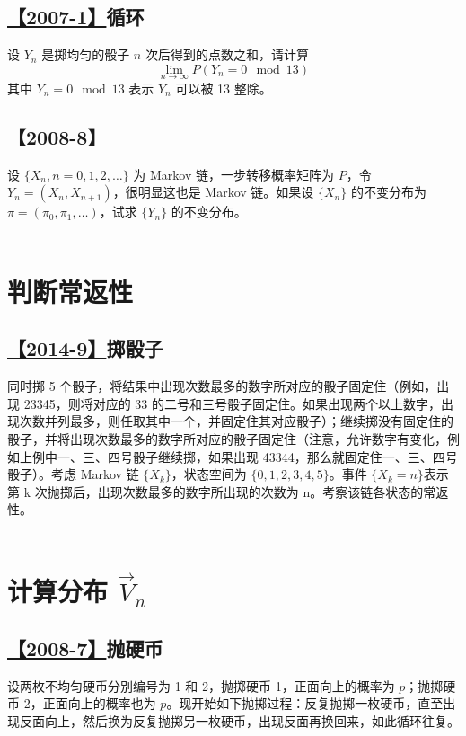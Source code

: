 \subsection{\hyperref[A2007-1]{【2007-1】}循环}\label{Q2007-1}

设 $Y_n$ 是掷均匀的骰子 $n$ 次后得到的点数之和，请计算
$$
\lim_{n\rightarrow\infty} P(Y_n=0 \mod 13)
$$
其中 $Y_n=0 \mod 13$ 表示 $Y_n$ 可以被 13 整除。

\subsection{【2008-8】}

设 $\{X_n, n=0, 1, 2, \dots\}$ 为 Markov 链，一步转移概率矩阵为 $P$，令 $Y_n=(X_n, X_{n+1})$，很明显这也是 Markov 链。如果设 $\{X_n\}$ 的不变分布为 $\pi=(\pi_0, \pi_1, \dots)$，试求 $\{Y_n\}$ 的不变分布。
\\\\
\section{判断常返性}

\subsection{\hyperref[A2014-9]{【2014-9】}掷骰子}\label{Q2014-9}

同时掷 5 个骰子，将结果中出现次数最多的数字所对应的骰子固定住（例如，出现 23345，则将对应的 33 的二号和三号骰子固定住。如果出现两个以上数字，出现次数并列最多，则任取其中一个，并固定住其对应骰子）；继续掷没有固定住的骰子，并将出现次数最多的数字所对应的骰子固定住（注意，允许数字有变化，例如上例中一、三、四号骰子继续掷，如果出现 43344，那么就固定住一、三、四号骰子）。考虑 Markov 链 $\{X_k\}$，状态空间为 $\{0, 1, 2, 3, 4, 5\}$。事件 $\{X_k=n\}$表示第 k 次抛掷后，出现次数最多的数字所出现的次数为 n。考察该链各状态的常返性。
\\\\
\section{计算分布 $\vec V_n$}

\subsection{\hyperref[A2008-7]{【2008-7】}抛硬币}\label{Q2008-7}

设两枚不均匀硬币分别编号为 1 和 2，抛掷硬币 1，正面向上的概率为 $p$；抛掷硬币 2，正面向上的概率也为 $p$。现开始如下抛掷过程：反复抛掷一枚硬币，直至出现反面向上，然后换为反复抛掷另一枚硬币，出现反面再换回来，如此循环往复。

